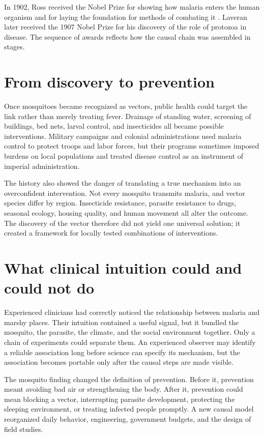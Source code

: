 \documentclass[12pt,oneside]{book}
\begin{document}
In 1902, Ross received the Nobel Prize for showing how malaria enters the human
organism and for laying the foundation for methods of combating it
\cite{ross1902}. Laveran later received the 1907 Nobel Prize for his discovery
of the role of protozoa in disease. The sequence of awards reflects how the
causal chain was assembled in stages.

\section{From discovery to prevention}
Once mosquitoes became recognized as vectors, public health could target the
link rather than merely treating fever. Drainage of standing water, screening
of buildings, bed nets, larval control, and insecticides all became possible
interventions. Military campaigns and colonial administrations used malaria
control to protect troops and labor forces, but their programs sometimes imposed
burdens on local populations and treated disease control as an instrument of
imperial administration.

The history also showed the danger of translating a true mechanism into an
overconfident intervention. Not every mosquito transmits malaria, and vector
species differ by region. Insecticide resistance, parasite resistance to drugs,
seasonal ecology, housing quality, and human movement all alter the outcome.
The discovery of the vector therefore did not yield one universal solution; it
created a framework for locally tested combinations of interventions.

\section{What clinical intuition could and could not do}
Experienced clinicians had correctly noticed the relationship between malaria
and marshy places. Their intuition contained a useful signal, but it bundled
the mosquito, the parasite, the climate, and the social environment together.
Only a chain of experiments could separate them. An experienced observer may
identify a reliable association long before science can specify its mechanism,
but the association becomes portable only after the causal steps are made
visible.

The mosquito finding changed the definition of prevention. Before it,
prevention meant avoiding bad air or strengthening the body. After it,
prevention could mean blocking a vector, interrupting parasite development,
protecting the sleeping environment, or treating infected people promptly. A
new causal model reorganized daily behavior, engineering, government budgets,
and the design of field studies.
\end{document}
